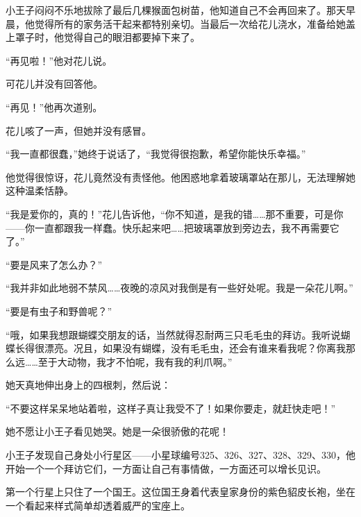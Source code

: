 小王子闷闷不乐地拔除了最后几棵猴面包树苗，他知道自己不会再回来了。那天早晨，他觉得所有的家务活干起来都特别亲切。当最后一次给花儿浇水，准备给她盖上罩子时，他觉得自己的眼泪都要掉下来了。

{\startalignment[center]
 \stopalignment}

{\startalignment[center]
 \stopalignment}

“再见啦！”他对花儿说。

可花儿并没有回答他。

“再见！”他再次道别。

花儿咳了一声，但她并没有感冒。

“我一直都很蠢，”她终于说话了，“我觉得很抱歉，希望你能快乐幸福。”

他觉得很惊讶，花儿竟然没有责怪他。他困惑地拿着玻璃罩站在那儿，无法理解她这种温柔恬静。

“我是爱你的，真的！”花儿告诉他，“你不知道，是我的错\ldots{}\ldots{}那不重要，可是你------你一直都跟我一样蠢。快乐起来吧\ldots{}\ldots{}把玻璃罩放到旁边去，我不再需要它了。”

“要是风来了怎么办？”

“我并非如此地弱不禁风\ldots{}\ldots{}夜晚的凉风对我倒是有一些好处呢。我是一朵花儿啊。”

“要是有虫子和野兽呢？”

“哦，如果我想跟蝴蝶交朋友的话，当然就得忍耐两三只毛毛虫的拜访。我听说蝴蝶长得很漂亮。况且，如果没有蝴蝶，没有毛毛虫，还会有谁来看我呢？你离我那么远\ldots{}\ldots{}至于大动物，我才不怕呢，我有我的利爪啊。”

她天真地伸出身上的四根刺，然后说：

“不要这样呆呆地站着啦，这样子真让我受不了！如果你要走，就赶快走吧！”

她不愿让小王子看见她哭。她是一朵很骄傲的花呢！


\stoptitle

\starttitle[title={10}]

小王子发现自己身处小行星区------小星球编号325、326、327、328、329、330，他开始一个一个拜访它们，一方面让自己有事情做，一方面还可以增长见识。

第一个行星上只住了一个国王。这位国王身着代表皇家身份的紫色貂皮长袍，坐在一个看起来样式简单却透着威严的宝座上。

